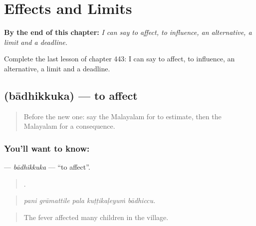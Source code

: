 
\chapter{Effects and Limits}
\label{ch:ml-effects-and-limits}

\begin{chapteropening}
\textbf{By the end of this chapter:} \emph{I can say to affect, to influence, an alternative, a limit and a deadline.}

Complete the last lesson of chapter 443: I can say to affect, to influence, an alternative, a limit and a deadline.
\end{chapteropening}

\section[\texorpdfstring{\ml{ബാധിക്കുക} (bādhikkuka)}{ബാധിക്കുക (bādhikkuka)}]{ (bādhikkuka) — to affect}

\label{lesson:ML-C443-badhikkuka}



\begin{quote}
Before the new one: say the Malayalam for to estimate, then the Malayalam for a consequence.
\end{quote}

\subsection*{You'll want to know: }
\textbf{} — \emph{bādhikkuka} — \textquotedblleft{}to affect\textquotedblright{}.

\begin{quote}
    .
\end{quote}

\begin{quote}
\emph{pani grāmattile pala kuṭṭikaḷeyuṁ bādhiccu.}
\end{quote}

\begin{quote}
The fever affected many children in the village.
\end{quote}

